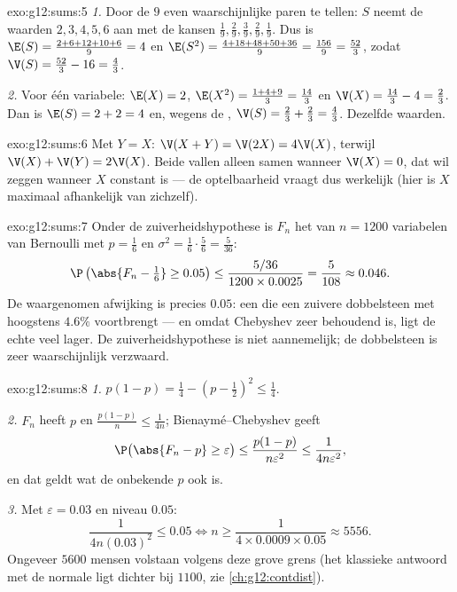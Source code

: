 \begin{solution}{exo:g12:sums:5}
\emph{1.} Door de $9$ even waarschijnlijke paren te tellen: $S$ neemt de
waarden $2, 3, 4, 5, 6$ aan met de kansen
$\frac19, \frac29, \frac39, \frac29, \frac19$. Dus is
$\E(S) = \frac{2 + 6 + 12 + 10 + 6}{9} = 4$ en
$\E(S^2) = \frac{4 + 18 + 48 + 50 + 36}{9} = \frac{156}{9} = \frac{52}{3}$,
zodat $\V(S) = \frac{52}{3} - 16 = \frac43$.

\emph{2.} Voor één variabele: $\E(X) = 2$,
$\E(X^2) = \frac{1 + 4 + 9}{3} = \frac{14}{3}$ en
$\V(X) = \frac{14}{3} - 4 = \frac23$. Dan is $\E(S) = 2 + 2 = 4$ en, wegens de
, $\V(S) = \frac23 + \frac23 = \frac43$. Dezelfde waarden.
\end{solution}

\begin{solution}{exo:g12:sums:6}
Met $Y = X$: $\V(X + Y) = \V(2X) = 4\V(X)$, terwijl
$\V(X) + \V(Y) = 2\V(X)$. Beide vallen alleen samen wanneer $\V(X) = 0$, dat
wil zeggen wanneer $X$ constant is --- de optelbaarheid vraagt dus werkelijk
 (hier is $X$ maximaal afhankelijk van zichzelf).
\end{solution}

\begin{solution}{exo:g12:sums:7}
Onder de zuiverheidshypothese is $F_n$ het  van $n = 1200$
variabelen van Bernoulli met $p = \frac16$ en
$\sigma^2 = \frac16\cdot\frac56 = \frac{5}{36}$:
\[
\P\left(\abs{F_n - \tfrac16} \geq 0.05\right)
\leq \frac{5/36}{1200 \times 0.0025} = \frac{5}{108} \approx 0.046 .
\]
De waargenomen afwijking is precies $0.05$: een  die een zuivere
dobbelsteen met  hoogstens $4.6\%$ voortbrengt --- en omdat Chebyshev zeer
behoudend is, ligt de echte  veel lager. De zuiverheidshypothese is niet
aannemelijk; de dobbelsteen is zeer waarschijnlijk verzwaard.
\end{solution}

\begin{solution}{exo:g12:sums:8}
\emph{1.} $p(1-p) = \frac14 - \left(p - \frac12\right)^2 \leq \frac14$.

\emph{2.} $F_n$ heeft  $p$ en 
$\frac{p(1-p)}{n} \leq \frac{1}{4n}$; Bienaymé--Chebyshev geeft
\[
\P\bigl(\abs{F_n - p} \geq \varepsilon\bigr)
\leq \frac{p(1-p)}{n\varepsilon^2} \leq \frac{1}{4n\varepsilon^2},
\]
en dat geldt wat de onbekende $p$ ook is.

\emph{3.} Met $\varepsilon = 0.03$ en niveau $0.05$:
\[
\frac{1}{4n(0.03)^2} \leq 0.05
\iff n \geq \frac{1}{4 \times 0.0009 \times 0.05} \approx 5556 .
\]
Ongeveer $5600$ mensen volstaan volgens deze grove grens (het klassieke
antwoord met de normale  ligt dichter bij $1100$, zie
\cref{ch:g12:contdist}).
\end{solution}

